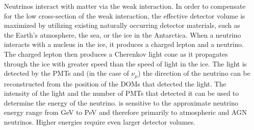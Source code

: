 Neutrinos interact with matter via the weak interaction.
In order to compensate for the low cross-section of the weak interaction,
  the effective detector volume is maximized by utilizing existing naturally occurring detector materials,
  such as
    the Earth's atmosphere,
    the sea,
    or the ice in the Antarctica.
%
When a neutrino interacts with a nucleus in the ice,
it produces a charged lepton and a neutrino.
The charged lepton then produces a Cherenkov light cone
as it propagates through the ice
with greater speed than the speed of light in the ice.
The light is detected by the \acp{PMT}
  and
    (in the case of $\nu_\mu$)
  the direction of the neutrino can be reconstructed
    from the position of the \acp{DOM}
      that detected the light.
The intensity of the light and the number of \acp{PMT} that detected it
  can be used to determine the energy of the neutrino.
%
\icecube{}
is sensitive to
  the approximate neutrino energy range
    from \si{\giga\electronvolt} to \si{\peta\electronvolt} \cite{icecube_aartsen}
  and therefore primarily to atmospheric and \ac{AGN} neutrinos.
Higher energies require even larger detector volumes.

